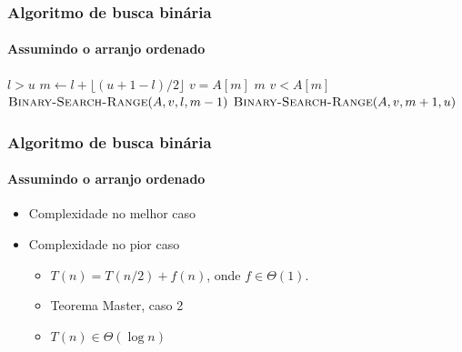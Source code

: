 \documentclass{beamer}
\begin{document}
\begin{frame}
  \frametitle{Algoritmo de busca binária}
  \framesubtitle{Assumindo o arranjo ordenado}
\begin{small}
\begin{codebox}
\zi \Comment {}
\li \If $l > u$
\li \Then
      \Return {}
\li \Else
\li   $m \gets l + \lfloor (u + 1 - l)/2 \rfloor$
\li   \If $v = A[m]$
\li   \Then \Return $m$
\li   \ElseIf $v < A[m]$
\li   \Then \Return $\textnormal{\scshape Binary-Search-Range}(A, v, l, m-1)$
\li   \ElseNoIf
\li \Return $\textnormal{\scshape Binary-Search-Range}(A, v, m+1, u)$
      \End
    \End
\zi \Comment {}
\end{codebox}  
\end{small}
\end{frame}

\begin{frame}
  \frametitle{Algoritmo de busca binária}
  \framesubtitle{Assumindo o arranjo ordenado}

\begin{itemize}

  \item Complexidade no melhor caso

  \item Complexidade no pior caso

    \begin{itemize}

    \item $T(n) = T(n/2) + f(n)$, onde $f \in \Theta(1)$.

    \item Teorema Master, caso 2

    \item $T(n) \in \Theta(\log n)$

    \end{itemize}

\end{itemize}

\end{frame}
\end{document}
